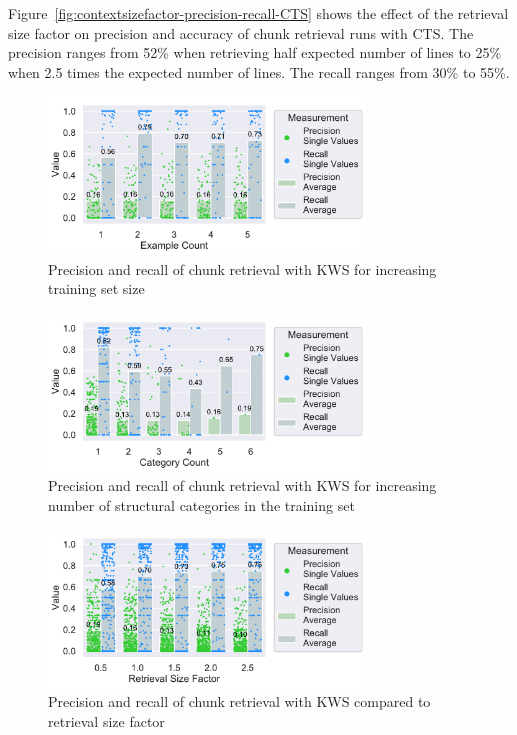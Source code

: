 \documentclass[\myrootdir/main.tex]{subfiles}
\begin{document}
Figure~\ref{fig:contextsizefactor-precision-recall-CTS} shows the effect of the retrieval size factor on precision and accuracy of chunk retrieval runs with CTS\@.
The precision ranges from 52\% when retrieving half expected number of lines to 25\% when 2.5 times the expected number of lines.
The recall ranges from 30\% to 55\%.


\begin{figure}[htbp]
		\centering
		\includegraphics[width=0.75\textwidth, clip]{img/big-study/recall-precision-examplecount-KWS.pdf}
		\caption{Precision and recall of chunk retrieval with KWS for increasing training set size}
		\label{fig:recall-precision-examplecount-KWS}
\end{figure}

\begin{figure}[htbp]
		\centering
		\includegraphics[width=0.75\textwidth, clip]{img/big-study/recall-precision-categorycount-KWS.pdf}
		\caption{Precision and recall of chunk retrieval with KWS for increasing number of structural categories in the training set}
		\label{fig:recall-precision-categorycount-KWS}
\end{figure}

\begin{figure}[htbp]
		\centering
		\includegraphics[width=0.75\textwidth, clip]{img/big-study/contextsizefactor-precision-recall-KWS.pdf}
		\caption{Precision and recall of chunk retrieval with KWS compared to retrieval size factor}
		\label{fig:contextsizefactor-precision-recall-KWS}
\end{figure}
\end{document}
